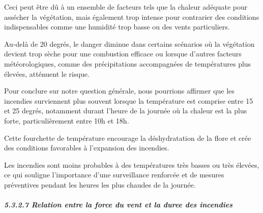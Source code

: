 \documentclass[
]{article}
\newenvironment{Shaded}{\begin{snugshade}}{\end{snugshade}}
\newcommand{\AttributeTok}[1]{\textcolor[rgb]{0.13,0.29,0.53}{#1}}
\newcommand{\ConstantTok}[1]{\textcolor[rgb]{0.56,0.35,0.01}{#1}}
\newcommand{\DecValTok}[1]{\textcolor[rgb]{0.00,0.00,0.81}{#1}}
\newcommand{\FunctionTok}[1]{\textcolor[rgb]{0.13,0.29,0.53}{\textbf{#1}}}
\newcommand{\NormalTok}[1]{#1}
\newcommand{\OtherTok}[1]{\textcolor[rgb]{0.56,0.35,0.01}{#1}}
\newcommand{\SpecialCharTok}[1]{\textcolor[rgb]{0.81,0.36,0.00}{\textbf{#1}}}
\newcommand{\StringTok}[1]{\textcolor[rgb]{0.31,0.60,0.02}{#1}}
\begin{document}
Ceci peut être dû à un ensemble de facteurs tels que la chaleur adéquate
pour assécher la végétation, mais également trop intense pour contrarier
des conditions indispensables comme une humidité trop basse ou des vents
particuliers.

Au-delà de 20 degrés, le danger diminue dans certains scénarios où la
végétation devient trop sèche pour une combustion efficace ou lorsque
d'autres facteurs météorologiques, comme des précipitations accompagnées
de températures plus élevées, atténuent le risque.

Pour conclure sur notre question générale, nous pourrions affirmer que
les incendies surviennent plus souvent lorsque la température est
comprise entre 15 et 25 degrés, notamment durant l'heure de la journée
où la chaleur est la plus forte, particulièrement entre 10h et 18h.

Cette fourchette de température encourage la déshydratation de la flore
et crée des conditions favorables à l'expansion des incendies.

Les incendies sont moins probables à des températures très basses ou
très élevées, ce qui souligne l'importance d'une surveillance renforcée
et de mesures préventives pendant les heures les plus chaudes de la
journée.

\subparagraph{5.3.2.7 Relation entre la force du vent et la duree des
incendies}\label{relation-entre-la-force-du-vent-et-la-duree-des-incendies}

\begin{Shaded}
\end{Shaded}
\end{document}

